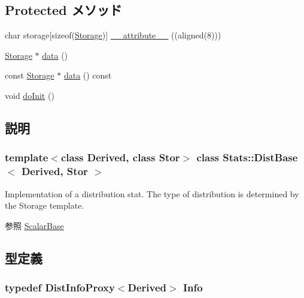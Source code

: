 \subsection*{Protected メソッド}
\begin{DoxyCompactItemize}
\item 
char storage\mbox{[}sizeof(\hyperlink{classStats_1_1DistBase_a5d4a6db0e7c32292f54a08d05c671bd1}{Storage})\mbox{]} \hyperlink{classStats_1_1DistBase_a72ec214acf2091c80c5794662602c42f}{\_\-\_\-attribute\_\-\_\-} ((aligned(8)))
\item 
\hyperlink{classStats_1_1DistBase_a5d4a6db0e7c32292f54a08d05c671bd1}{Storage} $\ast$ \hyperlink{classStats_1_1DistBase_a6616795ceb2f25c33a3c2d6c0a387514}{data} ()
\item 
const \hyperlink{classStats_1_1DistBase_a5d4a6db0e7c32292f54a08d05c671bd1}{Storage} $\ast$ \hyperlink{classStats_1_1DistBase_aabedc9303ac5bae8af18ceaeeb7fe44b}{data} () const 
\item 
void \hyperlink{classStats_1_1DistBase_acbb3b2ff6c84b7ae0dcc576f85bee3b5}{doInit} ()
\end{DoxyCompactItemize}


\subsection{説明}
\subsubsection*{template$<$class Derived, class Stor$>$ class Stats::DistBase$<$ Derived, Stor $>$}

Implementation of a distribution stat. The type of distribution is determined by the Storage template. \begin{DoxySeeAlso}{参照}
\hyperlink{classStats_1_1ScalarBase}{ScalarBase} 
\end{DoxySeeAlso}


\subsection{型定義}
\hypertarget{classStats_1_1DistBase_a6c7ed3194655a4ace77fb6881fee9f69}{
\subsubsection[{Info}]{\setlength{\rightskip}{0pt plus 5cm}typedef {\bf DistInfoProxy}$<$Derived$>$ {\bf Info}}}
\label{classStats_1_1DistBase_a6c7ed3194655a4ace77fb6881fee9f69}


